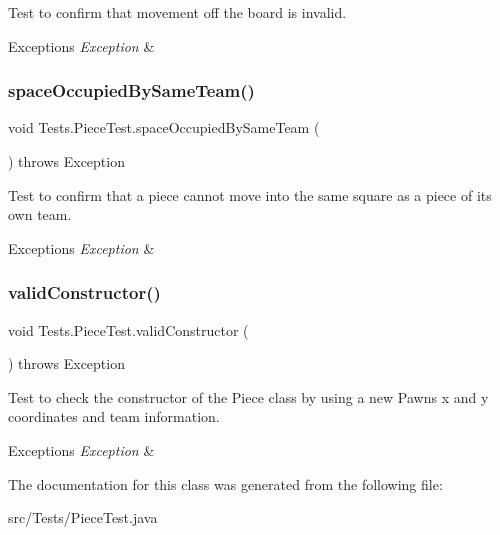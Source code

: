 Test to confirm that movement off the board is invalid. 
\begin{DoxyExceptions}{Exceptions}
{\em Exception} & \\
\hline
\end{DoxyExceptions}
\hypertarget{class_tests_1_1_piece_test_af08d686557ed19d88e13e3b3e387ab39}{}\label{class_tests_1_1_piece_test_af08d686557ed19d88e13e3b3e387ab39} 
\subsubsection{\texorpdfstring{space\+Occupied\+By\+Same\+Team()}{spaceOccupiedBySameTeam()}}
{\footnotesize\ttfamily void Tests.\+Piece\+Test.\+space\+Occupied\+By\+Same\+Team (\begin{DoxyParamCaption}{ }\end{DoxyParamCaption}) throws Exception}

Test to confirm that a piece cannot move into the same square as a piece of its own team. 
\begin{DoxyExceptions}{Exceptions}
{\em Exception} & \\
\hline
\end{DoxyExceptions}
\hypertarget{class_tests_1_1_piece_test_aa826a8207b7c0c34461cadbd06e86683}{}\label{class_tests_1_1_piece_test_aa826a8207b7c0c34461cadbd06e86683} 
\subsubsection{\texorpdfstring{valid\+Constructor()}{validConstructor()}}
{\footnotesize\ttfamily void Tests.\+Piece\+Test.\+valid\+Constructor (\begin{DoxyParamCaption}{ }\end{DoxyParamCaption}) throws Exception}

Test to check the constructor of the Piece class by using a new Pawn\textquotesingle{}s x and y coordinates and team information. 
\begin{DoxyExceptions}{Exceptions}
{\em Exception} & \\
\hline
\end{DoxyExceptions}


The documentation for this class was generated from the following file\+:\begin{DoxyCompactItemize}
\item 
src/\+Tests/Piece\+Test.\+java\end{DoxyCompactItemize}
